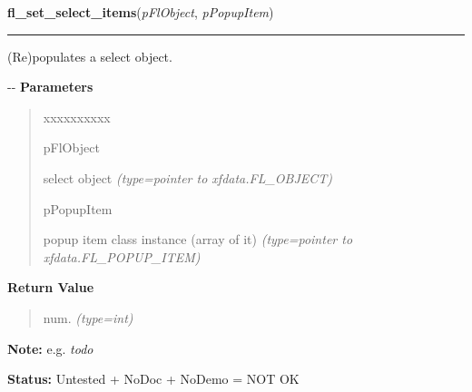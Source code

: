     \label{xformslib:flselect:fl_set_select_items}

    \vspace{0.5ex}

\hspace{.8\funcindent}\begin{boxedminipage}{\funcwidth}

    \raggedright \textbf{fl\_set\_select\_items}(\textit{pFlObject}, \textit{pPopupItem})

    \vspace{-1.5ex}

    \rule{\textwidth}{0.5\fboxrule}
\setlength{\parskip}{2ex}

(Re)populates a select object.

-{}-
\setlength{\parskip}{1ex}
      \textbf{Parameters}
      \vspace{-1ex}

      \begin{quote}
        \begin{Ventry}{xxxxxxxxxx}

          \item[pFlObject]


select object
            {\it (type=pointer to xfdata.FL\_OBJECT)}

          \item[pPopupItem]


popup item class instance (array of it)
            {\it (type=pointer to xfdata.FL\_POPUP\_ITEM)}

        \end{Ventry}

      \end{quote}

      \textbf{Return Value}
    \vspace{-1ex}

      \begin{quote}

num.
      {\it (type=int)}

      \end{quote}

\textbf{Note:} 
e.g. \emph{todo}


\textbf{Status:} 
Untested + NoDoc + NoDemo = NOT OK


    \end{boxedminipage}

    \label{xformslib:flselect:fl_get_select_popup}

